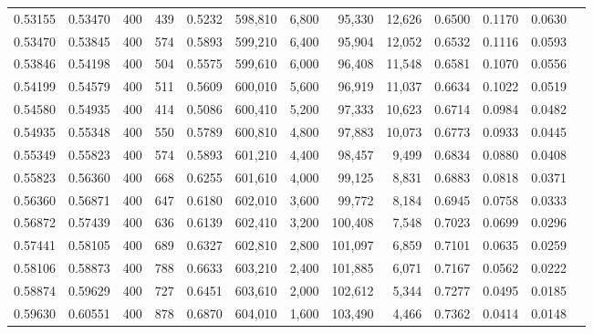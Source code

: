 \begin{tabular}{rrrrrrrrrrrrr}
0.53155 & 0.53470 &    400 &   439 &                                     0.5232 & 598,810 &   6,800 &  95,330 &  12,626 & 0.6500 & 0.1170 & 0.0630 \\
0.53470 & 0.53845 &    400 &   574 &                                     0.5893 & 599,210 &   6,400 &  95,904 &  12,052 & 0.6532 & 0.1116 & 0.0593 \\
0.53846 & 0.54198 &    400 &   504 &                                     0.5575 & 599,610 &   6,000 &  96,408 &  11,548 & 0.6581 & 0.1070 & 0.0556 \\
0.54199 & 0.54579 &    400 &   511 &                                     0.5609 & 600,010 &   5,600 &  96,919 &  11,037 & 0.6634 & 0.1022 & 0.0519 \\
0.54580 & 0.54935 &    400 &   414 &                                     0.5086 & 600,410 &   5,200 &  97,333 &  10,623 & 0.6714 & 0.0984 & 0.0482 \\
0.54935 & 0.55348 &    400 &   550 &                                     0.5789 & 600,810 &   4,800 &  97,883 &  10,073 & 0.6773 & 0.0933 & 0.0445 \\
0.55349 & 0.55823 &    400 &   574 &                                     0.5893 & 601,210 &   4,400 &  98,457 &   9,499 & 0.6834 & 0.0880 & 0.0408 \\
0.55823 & 0.56360 &    400 &   668 &                                     0.6255 & 601,610 &   4,000 &  99,125 &   8,831 & 0.6883 & 0.0818 & 0.0371 \\
0.56360 & 0.56871 &    400 &   647 &                                     0.6180 & 602,010 &   3,600 &  99,772 &   8,184 & 0.6945 & 0.0758 & 0.0333 \\
0.56872 & 0.57439 &    400 &   636 &                                     0.6139 & 602,410 &   3,200 & 100,408 &   7,548 & 0.7023 & 0.0699 & 0.0296 \\
0.57441 & 0.58105 &    400 &   689 &                                     0.6327 & 602,810 &   2,800 & 101,097 &   6,859 & 0.7101 & 0.0635 & 0.0259 \\
0.58106 & 0.58873 &    400 &   788 &                                     0.6633 & 603,210 &   2,400 & 101,885 &   6,071 & 0.7167 & 0.0562 & 0.0222 \\
0.58874 & 0.59629 &    400 &   727 &                                     0.6451 & 603,610 &   2,000 & 102,612 &   5,344 & 0.7277 & 0.0495 & 0.0185 \\
0.59630 & 0.60551 &    400 &   878 &                                     0.6870 & 604,010 &   1,600 & 103,490 &   4,466 & 0.7362 & 0.0414 & 0.0148 \\

\end{tabular}
